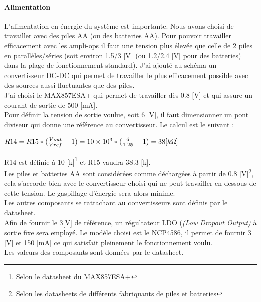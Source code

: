 \documentclass[a4paper,10pt]{article}
\begin{document}
 \paragraph{Alimentation}
 L'alimentation en énergie du système est importante. Nous avons choisi de travailler avec des piles AA (ou des batteries AA). Pour pouvoir travailler efficacement avec les ampli-ops il faut une tension plus élevée que celle de 2 piles en parallèles/séries (soit environ 1.5/3 [V] (ou 1.2/2.4 [V] pour des batteries) dans la plage de fonctionnement standard). J'ai ajouté au schéma un convertisseur DC-DC qui permet de travailler le plus efficacement possible avec des sources aussi fluctuantes que des piles. \\
 J'ai choisi le MAX857ESA+ qui permet de travailler dès 0.8 [V] et qui assure un courant de sortie de 500 [mA]. \\
 Pour définir la tension de sortie voulue, soit 6 [V], il faut dimensionner un pont diviseur qui donne une référence au convertisseur. Le calcul est le suivant :
\begin{center}
 $ R14 = R15*(\frac{Vout}{Vref}-1) = \num{10e3}*(\frac{6}{1.25}-1) = 38 [k\ohm]$
\end{center} 
R14 est définie à 10 [k\ohm]\footnote{Selon le datasheet du MAX857ESA+} et R15 vaudra 38.3 [k\ohm].\\
Les piles et batteries AA sont considérées comme déchargées à partir de 0.8 [V]\footnote{Selon les datasheets de différents fabriquants de piles et batteries}, cela s'accorde bien avec le convertisseur choisi qui ne peut travailler en dessous de cette tension. Le gaspillage d'énergie sera alors minime.\\
Les autres composants se rattachant au convertisseurs sont définis par le datasheet.\\
Afin de fournir le 3[V] de référence, un régultateur LDO ({\itshape(Low Dropout Output)} à sortie fixe sera employé. Le modèle choisi est le NCP4586, il permet de fournir 3 [V] et 150 [mA] ce qui satisfait pleinement le fonctionnement voulu.\\
Les valeurs des composants sont données par le datasheet.
\end{document}

